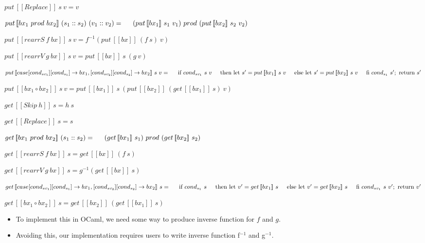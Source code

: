 \documentclass[runningheads]{llncs}
\newcommand{\tab}{\hspace*{5mm}}
\newcommand{\product}[2]{#1 \ prod \ #2}
\newcommand{\tuple}[2]{(#1 :: #2)}
\newcommand{\rearrS}[2]{rearrS \ #1 \ #2}
\newcommand{\rearrV}[2]{rearrV \ #1 \ #2}
\newcommand{\casebx}[6]{case [#1][#2] \to #3, [#4][#5] \to #6}
\newcommand{\putbx}[3]{put \, [\![#1]\!] \ #2 \ #3}
\newcommand{\getbx}[2]{get \, [\![#1]\!] \ #2}
\begin{document}
$\putbx{Replace}{s}{v} = v$

$\putbx{\product{bx_1}{bx_2}}{\tuple{s_1}{s_2}}{\tuple{v_1}{v_2}} =\\
    \tab \product{(\putbx{bx_1}{s_1}{v_1})}{(\putbx{bx_2}{s_2}{v_2})}$

$\putbx{\rearrS{f}{bx}}{s}{v} = f^{-1}(\putbx{bx}{(f \ s)}{v})$

$\putbx{\rearrV{g}{bx}}{s}{v} = \putbx{bx}{s}{(g \ v)}$

$\putbx{\casebx{cond_{sv_1}}{cond_{s_1}}{bx_1}{cond_{sv_2}}{cond_{s_2}}{bx_2}}{s}{v} = \\
    \tab \text{if } {cond_{sv_1} \ s \ v} \\
    \tab \text{then let } s' = \putbx{bx_1}{s}{v} \\
    \tab \text{else let } s' = \putbx{bx_2}{s}{v} \\
    \tab \text{fi } cond_{s_1} \ s'; \ \text{return} \ s'$

$\putbx{bx_1 \circ bx_2}{s}{v} = \putbx{bx_1}{s}{(\putbx{bx_2}{(\getbx{bx_1}{s})}{v})}$

\vspace{5mm}

$\getbx{Skip \ h}{s} = h \ s$

$\getbx{Replace}{s} = s$

$\getbx{\product{bx_1}{bx_2}}{\tuple{s_1}{s_2}} = \\
    \tab \product{(\getbx{bx_1}{s_1})}{(\getbx{bx_2}{s_2})}$

$\getbx{\rearrS{f}{bx}}{s} = \getbx{bx}{(f \ s)}$

$\getbx{\rearrV{g}{bx}}{s} = g^{-1} (\getbx{bx}{s})$

$\getbx{\casebx{cond_{sv_1}}{cond_{s_1}}{bx_1}{cond_{sv_2}}{cond_{s_2}}{bx_2}}{s} =\\
    \tab \text{if} \ {cond_{s_1} \ s}\\
    \tab \text{then let} \ v' = \getbx{bx_1}{s}\\
    \tab \text{else let} \ v' = \getbx{bx_2}{s}\\
    \tab \text{fi} \ {cond_{sv_1} \ s \ v'}; \ \text{return} \ v'$

$\getbx{bx_1 \circ bx_2}{s} = \getbx{bx_2}{(\getbx{bx_1}{s})}$

\begin{itemize}
\item To implement this in OCaml, we need some way to produce inverse function for $f$ and $g$.
\item Avoiding this, our implementation requires users to write inverse function f$^{-1}$ and g$^{-1}$.
\end{itemize}
\end{document}
